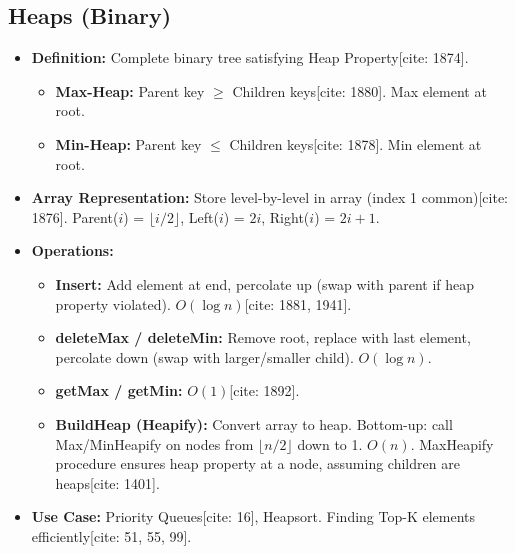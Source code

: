 \documentclass{article}
\begin{document}
\subsection{Heaps (Binary)}
\begin{itemize}
    \item \textbf{Definition:} Complete binary tree satisfying Heap Property[cite: 1874].
          \begin{itemize}
              \item \textbf{Max-Heap:} Parent key $\ge$ Children keys[cite: 1880]. Max element at root.
              \item \textbf{Min-Heap:} Parent key $\le$ Children keys[cite: 1878]. Min element at root.
          \end{itemize}
    \item \textbf{Array Representation:} Store level-by-level in array (index 1 common)[cite: 1876]. Parent($i$) = $\lfloor i/2 \rfloor$, Left($i$) = $2i$, Right($i$) = $2i+1$.
    \item \textbf{Operations:}
          \begin{itemize}
              \item \textbf{Insert:} Add element at end, percolate up (swap with parent if heap property violated). $O(\log n)$[cite: 1881, 1941].
              \item \textbf{deleteMax / deleteMin:} Remove root, replace with last element, percolate down (swap with larger/smaller child). $O(\log n)$.
              \item \textbf{getMax / getMin:} $O(1)$[cite: 1892].
              \item \textbf{BuildHeap (Heapify):} Convert array to heap. Bottom-up: call Max/MinHeapify on nodes from $\lfloor n/2 \rfloor$ down to 1. $O(n)$. MaxHeapify procedure ensures heap property at a node, assuming children are heaps[cite: 1401].
          \end{itemize}
    \item \textbf{Use Case:} Priority Queues[cite: 16], Heapsort. Finding Top-K elements efficiently[cite: 51, 55, 99].
\end{itemize}
\end{document}
